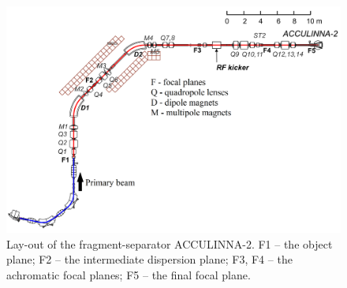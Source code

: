 \begin{figure}[t]
	\begin{center}
		\includegraphics[width=1\textwidth]{figures/acculinna2.png}
	\end{center}
	\caption{Lay-out of the fragment-separator ACCULINNA-2. F1 – the object plane; F2 – the intermediate dispersion plane; F3, F4 – the achromatic focal planes; F5 – the final focal plane.}
	\label{fig:acculinna2_scheme}
\end{figure}



